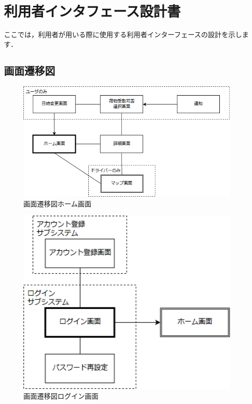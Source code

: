 \documentclass[a4j,titlepage]{jarticle}
\begin{document}
\newpage

\section{利用者インタフェース設計書}
ここでは，利用者が用いる際に使用する利用者インターフェースの設計を示します．

\subsection{画面遷移図}

\begin{figure}[H]
 \begin{center}
  \includegraphics[width=150mm]{screen_transition_home.png}
	\caption{画面遷移図ホーム画面}
	\label{fig:screen_transition_home}
 \end{center}

\end{figure}

\begin{figure}[H]
 \begin{center}
  \includegraphics[width=130mm]{screen_transition_login.png}
	\caption{画面遷移図ログイン画面}
	\label{fig:screen_transition_login}
 \end{center}

\end{figure}
\end{document}
